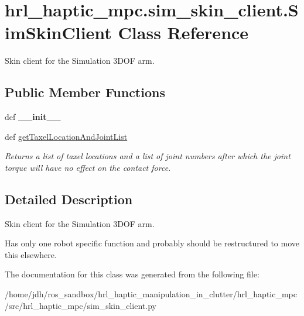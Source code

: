 \hypertarget{classhrl__haptic__mpc_1_1sim__skin__client_1_1_sim_skin_client}{\section{hrl\-\_\-haptic\-\_\-mpc.\-sim\-\_\-skin\-\_\-client.\-Sim\-Skin\-Client \-Class \-Reference}
\label{classhrl__haptic__mpc_1_1sim__skin__client_1_1_sim_skin_client}
}


\-Skin client for the \-Simulation 3\-D\-O\-F arm.  


\subsection*{\-Public \-Member \-Functions}
\begin{DoxyCompactItemize}
\item 
\hypertarget{classhrl__haptic__mpc_1_1sim__skin__client_1_1_sim_skin_client_a8a106475f6e9e9b5c9e310cd52ed3394}{def {\bfseries \-\_\-\-\_\-init\-\_\-\-\_\-}}\label{classhrl__haptic__mpc_1_1sim__skin__client_1_1_sim_skin_client_a8a106475f6e9e9b5c9e310cd52ed3394}

\item 
\hypertarget{classhrl__haptic__mpc_1_1sim__skin__client_1_1_sim_skin_client_a4c6871a3799d1b91ae0f447e258913a9}{def \hyperlink{classhrl__haptic__mpc_1_1sim__skin__client_1_1_sim_skin_client_a4c6871a3799d1b91ae0f447e258913a9}{get\-Taxel\-Location\-And\-Joint\-List}}\label{classhrl__haptic__mpc_1_1sim__skin__client_1_1_sim_skin_client_a4c6871a3799d1b91ae0f447e258913a9}

\begin{DoxyCompactList}\small\item\em \-Returns a list of taxel locations and a list of joint numbers after which the joint torque will have no effect on the contact force. \end{DoxyCompactList}\end{DoxyCompactItemize}


\subsection{\-Detailed \-Description}
\-Skin client for the \-Simulation 3\-D\-O\-F arm. 

\-Has only one robot specific function and probably should be restructured to move this elsewhere. 

\-The documentation for this class was generated from the following file\-:\begin{DoxyCompactItemize}
\item 
/home/jdh/ros\-\_\-sandbox/hrl\-\_\-haptic\-\_\-manipulation\-\_\-in\-\_\-clutter/hrl\-\_\-haptic\-\_\-mpc/src/hrl\-\_\-haptic\-\_\-mpc/sim\-\_\-skin\-\_\-client.\-py\end{DoxyCompactItemize}
